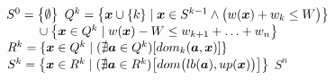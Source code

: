 \begin{algorithmic}[1]
    \State $S^0 = \big\{\emptyset\big\}$
      \State $Q^k = \big\{\boldsymbol{x} \cup \{k\} \;|\; \boldsymbol{x}
        \in S^{k-1} \wedge \big(w(\boldsymbol{x}) + w_k \leq W\big) \big\}$
        \State $\phantom{\solSetA^k = } \cup \big\{ \sol{x} \in \solSetA^k \;|\;
          \weight{x} - W \leq w_{k+1} + \ldots + w_n \big\}$
      \State $R^k = \{\boldsymbol{x} \in Q^k \;|\; (\nexists \boldsymbol{a} \in Q^k)[dom_k(\boldsymbol{a}, \boldsymbol{x})] \}$
      \State $S^k = \big\{ \boldsymbol{x} \in R^k \;|\; (\nexists \boldsymbol{a} \in R^k)\big[dom\big(lb(\boldsymbol{a}), up(\boldsymbol{x})\big)\big]\big\}$
    \EndFor
    \State \Return $S^n$
  \EndFunction
\end{algorithmic}


